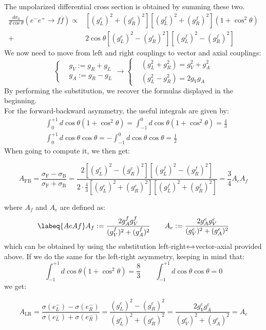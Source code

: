 \documentclass[../main.tex]{subfiles}
\begin{document}
The unpolarized differential cross section is obtained by summing these two.
\begin{align*}
\frac{d\sigma_0}{d\cos\theta}(e^-e^+\to f\overline{f})\propto&[(g_L^e)^2+(g_R^e)^2][(g_L^f)^2+(g_R^f)^2](1+\cos^2\theta)\\
+&2\cos\theta[(g_L^e)^2-(g_R^e)^2][(g_L^f)^2-(g_R^f)^2]
\end{align*}
We now need to move from left and right couplings to vector and axial couplings:
\[
\left\{
\begin{aligned}
&g_V:=g_R+g_L\\
&g_A:=g_R-g_L
\end{aligned}
\right.
\to
\left\{
\begin{aligned}
&(g_L^2+g_R^2)=g_V^2+g_A^2\\
&(g_L^2-g_R^2)=2g_Vg_A
\end{aligned}
\right.
\]
By performing the substitution, we recover the formulas displayed in the beginning.\\
For the forward-backward asymmetry, the useful integrals are given by:
\begin{align*}
&\int_0^{+1}d\cos\theta(1+\cos^2\theta)=\int_{-1}^0d\cos\theta(1+\cos^2\theta)=\frac{4}{3}\\
&\int_0^{+1}d\cos\theta\cos\theta=-\int_{-1}^0d\cos\theta\cos\theta=\frac{1}{2}
\end{align*}
When going to compute it, we then get:
\begin{kaobox}[frametitle=Forward-Backward Asymmetry]
\[
A_{\text{FB}}=\frac{\sigma_{\text{F}}-\sigma_{\text{B}}}{\sigma_{\text{F}}+\sigma_{\text{B}}}=\frac{2[(g_L^e)^2-(g_R^e)^2][(g_L^f)^2-(g_R^f)^2]}{2\cdot\frac{4}{3}[(g_L^e)^2+(g_R^e)^2][(g_L^f)^2+(g_R^f)^2]}=\frac{3}{4}A_eA_f
\]
\end{kaobox}
where $A_f$ and $A_e$ are defined as:
\begin{equation}
\labeq{AeAf}
A_f:=\frac{2g_A^fg_V^f}{(g_V^f)^2+(g_A^f)^2} \qquad A_e:=\frac{2g_A^eg_V^e}{(g_V^e)^2+(g_A^e)^2}
\end{equation}
which can be obtained by using the substitution left-right$\xleftrightarrow[]{}$vector-axial provided above. If we do the same for the left-right asymmetry, keeping in mind that:
\[
\int_{-1}^{+1}d\cos\theta(1+\cos^2\theta)=\frac{8}{3} \qquad \int_{-1}^{+1}d\cos\theta\cos\theta=0
\]
we get:
\begin{kaobox}[frametitle=Left-Right Asymmetry]
\[
A_{\text{LR}}=\frac{\sigma(e_L^-)-\sigma(e_R^-)}{\sigma(e_L^-)+\sigma(e_R^-)}=\frac{(g_L^e)^2-(g_R^e)^2}{(g_L^e)^2+(g_R^e)^2}=\frac{2g_V^eg_A^e}{(g_V^e)^2+(g_A^e)^2}=A_e
\]
\end{kaobox}
\end{document}
